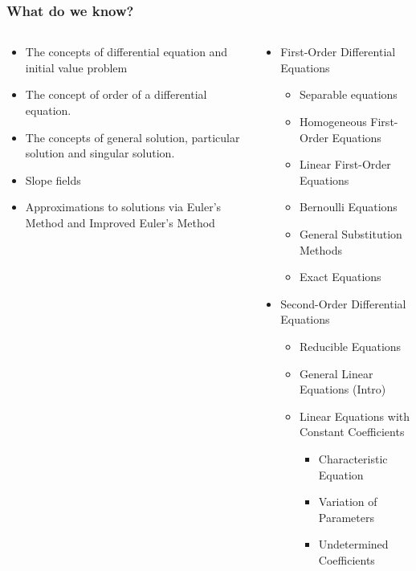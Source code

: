 \documentclass[9pt,xcolor=x11names,compress]{beamer}
\begin{document}
\begin{frame}\frametitle{What do we know?}
\begin{columns}[T]
\begin{column}{0.45\linewidth}
\begin{itemize}
\item The concepts of \alert{differential equation} and \alert{initial value problem}
\item The concept of \alert{order} of a differential equation.
\item The concepts of \alert{general solution}, \alert{particular solution} and \alert{singular solution}.
\item \alert{Slope fields}
\item Approximations to solutions via \alert{Euler's Method} and \alert{Improved Euler's Method}
\end{itemize} 
\end{column}
\begin{column}{0.55\linewidth}
\begin{itemize}
\item First-Order Differential Equations
\begin{itemize}
\item Separable equations 
\item Homogeneous First-Order Equations 
\item Linear First-Order Equations 
\item Bernoulli Equations 
\item General Substitution Methods
\item Exact Equations 
\end{itemize}
\item Second-Order Differential Equations
\begin{itemize}
	\item Reducible Equations
	\item General Linear Equations (Intro)
	\item Linear Equations with Constant Coefficients
	\begin{itemize}
		\item Characteristic Equation
		\item Variation of Parameters
		\item Undetermined Coefficients
	\end{itemize}
\end{itemize}
\end{itemize}
\end{column}
\end{columns}
\end{frame}
\end{document}
